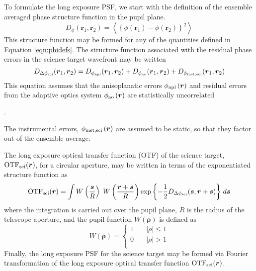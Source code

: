 To formulate the long exposure PSF, we start with the
definition of the ensemble averaged phase structure function in the
pupil plane.
\begin{equation}
\label{eqn:strfn_def}
D_{\phi}(\boldsymbol{r}_{1},\boldsymbol{r}_{2})  = 
\left\langle \left\{\phi\left(\boldsymbol{r}_{1}\right) - 
\phi\left(\boldsymbol{r}_{2}\right)\right\}^{2}\right\rangle
\end{equation}
This structure function may be formed for any of the quantities
defined in Equation \ref{eqn:phidefs}.  The structure function associated
with the residual phase errors in the science target wavefront may be written
\begin{equation}\label{eqn:lgsstrfn}
D_{\Delta\phi_{\rm sci}}(\boldsymbol{r}_{1},\boldsymbol{r}_{2}) = 
D_{\phi_{\rm apl}}(\boldsymbol{r}_{1},\boldsymbol{r}_{2}) 
+ D_{\phi_{\rm ao}}(\boldsymbol{r}_{1},\boldsymbol{r}_{2}) 
+ D_{\phi_{\rm inst,sci}}(\boldsymbol{r}_{1},\boldsymbol{r}_{2}) 
\end{equation}
This equation assumes that the anisoplanatic errors $\phi_{\rm
  apl}\left(\boldsymbol{r}\right)$ and residual errors from the
adaptive optics system $\phi_{\rm ao}\left(\boldsymbol{r}\right)$ are
statistically uncorrelated
\begin{notes}
.
\end{notes}
The instrumental errors, 
$\phi_{\rm  inst,sci}\left(\boldsymbol{r}\right)$ 
are assumed to be static, so that they factor out of the ensemble average.

The long exposure optical transfer function (OTF) of the science target,
${\rm OTF}_{\rm sci}(\boldsymbol{r})$, for a circular aperture, may be written 
in terms of the exponentiated structure function as
\begin{equation}\label{eqn:lgsotf}
{\rm OTF}_{\rm sci}(\boldsymbol{r}) = 
\int 
W\left(\frac{\boldsymbol{s}}{R}\right) \;
W\left(\frac{\boldsymbol{r} + \boldsymbol{s}}{R}\right)
\exp{ \left\{ -\frac{1}{2} 
D_{\Delta\phi_{\rm sci}}(\boldsymbol{s}, \boldsymbol{r} + \boldsymbol{s})
\right\} } 
\; d\boldsymbol{s}
\end{equation}
where the integration is carried out over the pupil plane, $R$ is the
radius of the telescope aperture, and the pupil function
$W\left(\boldsymbol{\rho}\right)$ is defined as
\begin{equation}\label{pupileqn}
W\left(\boldsymbol{\rho}\right) = 
\left\{
\begin{aligned}
1 & \quad \left\vert \rho \right\vert \le 1 \\
0 & \quad \left\vert \rho \right\vert > 1 \\
\end{aligned}
\right.
\end{equation}
Finally, the long exposure PSF for the science target may be
formed via Fourier transformation of the long exposure optical
transfer function ${\rm OTF}_{\rm sci}(\boldsymbol{r})$.

